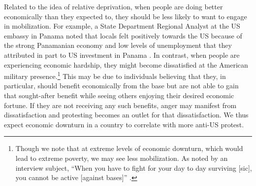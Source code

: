Related to the idea of relative deprivation, when people are doing better economically than they expected to, they should be less likely to want to engage in mobilization. For example, a State Department Regional Analyst at the US embassy in Panama noted that locals felt positively towards the US because of the strong Panamanian economy and low levels of unemployment that they attributed in part to US investment in Panama \cite{embthree20180712}. In contrast, when people are experiencing economic hardship, they might become dissatisfied at the American military presence.\footnote{Though we note that at extreme levels of economic downturn, which would lead to extreme poverty, we may see less mobilization. As noted by an interview subject, ``When you have to fight for your day to day surviving [sic], you cannot be active [against bases]'' \cite{berlinone20190723}.}  This may be due to individuals believing that they, in particular, should benefit economically from the base but are not able to gain that sought-after benefit while seeing others enjoying their desired economic fortune.  If they are not receiving any such benefits, anger may manifest from dissatisfaction and protesting becomes an outlet for that dissatisfaction. We thus expect economic downturn in a country to correlate with more anti-US protest.





